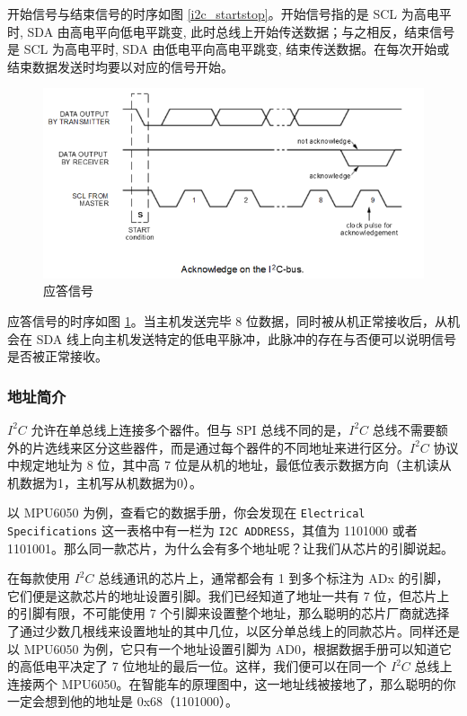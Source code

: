 开始信号与结束信号的时序如图 \ref{i2c_startstop}。开始信号指的是 SCL 为高电平时, SDA 由高电平向低电平跳变, 此时总线上开始传送数据；与之相反，结束信号是 SCL 为高电平时, SDA 由低电平向高电平跳变, 结束传送数据。在每次开始或结束数据发送时均要以对应的信号开始。

\begin{figure}[h]
\centering %
\includegraphics[width=.8\textwidth]{i2c_ack.png}
\caption{应答信号}
\label{i2c_ack}
\end{figure}

应答信号的时序如图 \ref{i2c_ack}。当主机发送完毕 8 位数据，同时被从机正常接收后，从机会在 SDA 线上向主机发送特定的低电平脉冲，此脉冲的存在与否便可以说明信号是否被正常接收。

\subsubsection{地址简介}
$I^2C$ 允许在单总线上连接多个器件。但与 SPI 总线不同的是，$I^2C$ 总线不需要额外的片选线来区分这些器件，而是通过每个器件的不同地址来进行区分。$I^2C$ 协议中规定地址为 8 位，其中高 7 位是从机的地址，最低位表示数据方向（主机读从机数据为1，主机写从机数据为0）。

以 MPU6050 为例，查看它的数据手册，你会发现在 \lstinline{Electrical Specifications} 这一表格中有一栏为 \lstinline{I2C ADDRESS}，其值为 1101000 或者 1101001。那么同一款芯片，为什么会有多个地址呢？让我们从芯片的引脚说起。

在每款使用 $I^2C$ 总线通讯的芯片上，通常都会有 1 到多个标注为 ADx 的引脚，它们便是这款芯片的地址设置引脚。我们已经知道了地址一共有 7 位，但芯片上的引脚有限，不可能使用 7 个引脚来设置整个地址，那么聪明的芯片厂商就选择了通过少数几根线来设置地址的其中几位，以区分单总线上的同款芯片。同样还是以 MPU6050 为例，它只有一个地址设置引脚为 AD0，根据数据手册可以知道它的高低电平决定了 7 位地址的最后一位。这样，我们便可以在同一个 $I^2C$ 总线上连接两个 MPU6050。在智能车的原理图中，这一地址线被接地了，那么聪明的你一定会想到他的地址是 0x68（1101000）。

